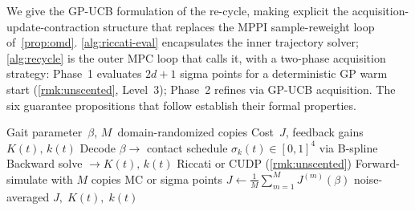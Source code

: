 \begin{remark}
\label{rmk:omd-algorithm}
We give the GP-UCB formulation of the re-cycle, making explicit
the acquisition-update-contraction structure that replaces
the MPPI sample-reweight loop of~\cref{prop:omd}.
\cref{alg:riccati-eval} encapsulates the inner trajectory solver;
\cref{alg:recycle} is the outer MPC loop that calls it,
with a two-phase acquisition strategy: Phase~1 evaluates
$2d{+}1$ sigma points for a deterministic GP warm start
(\cref{rmk:unscented}, Level~3); Phase~2 refines via
GP-UCB acquisition.
The six guarantee propositions that follow establish their
formal properties.
\end{remark}

\begin{algorithm}[ht]
\caption{Riccati trajectory evaluation}
\label{alg:riccati-eval}
\begin{algorithmic}[1]
\Require Gait parameter~$\beta$, $M$~domain-randomized copies
\Ensure Cost~$J$, feedback gains $K(t),\, k(t)$
\State Decode $\beta \to$ contact schedule
  $\sigma_k(t) \in [0,1]^4$ via B-spline
\State Backward solve $\to K(t),\, k(t)$
  \hfill\textcolor{ConColor}{\small Riccati or CUDP
  (\cref{rmk:unscented})}
\State Forward-simulate with $M$ copies
  \hfill\textcolor{ConColor}{\small MC or sigma points}
\State $J \gets \frac{1}{M}\sum_{m=1}^{M} J^{(m)}(\beta)$
  \hfill\textcolor{ConColor}{\small noise-averaged}
\State \Return $J,\; K(t),\; k(t)$
\end{algorithmic}
\end{algorithm}

